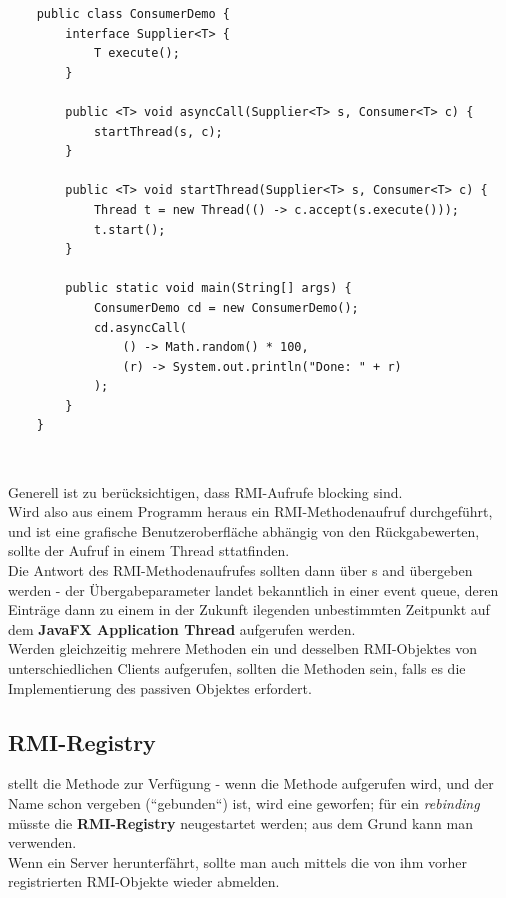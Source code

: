 \begin{verbatim}
    public class ConsumerDemo {
        interface Supplier<T> {
            T execute();
        }

        public <T> void asyncCall(Supplier<T> s, Consumer<T> c) {
            startThread(s, c);
        }

        public <T> void startThread(Supplier<T> s, Consumer<T> c) {
            Thread t = new Thread(() -> c.accept(s.execute()));
            t.start();
        }

        public static void main(String[] args) {
            ConsumerDemo cd = new ConsumerDemo();
            cd.asyncCall(
                () -> Math.random() * 100,
                (r) -> System.out.println("Done: " + r)
            );
        }
    }
\end{verbatim}\\

\begin{tcolorbox}
    Generell ist zu berücksichtigen, dass RMI-Aufrufe blocking sind.\\
    Wird also aus einem Programm heraus ein RMI-Methodenaufruf durchgeführt, und ist eine grafische Benutzeroberfläche abhängig von den Rückgabewerten, sollte der Aufruf in einem Thread sttatfinden.\\
    Die Antwort des RMI-Methodenaufrufes sollten dann über s and  übergeben werden - der Übergabeparameter landet bekanntlich in einer event queue, deren Einträge dann zu einem in der Zukunft ilegenden unbestimmten Zeitpunkt auf dem \textbf{JavaFX Application Thread} aufgerufen werden.\\
    Werden gleichzeitig mehrere Methoden ein und desselben RMI-Objektes von unterschiedlichen Clients aufgerufen, sollten die Methoden  sein, falls es die Implementierung des passiven Objektes erfordert.
\end{tcolorbox}

\subsection{RMI-Registry}

 stellt die Methode  zur Verfügung - wenn die Methode aufgerufen wird, und der Name schon vergeben (``gebunden``) ist, wird eine  geworfen; für ein \textit{rebinding} müsste die \textbf{RMI-Registry} neugestartet werden; aus dem Grund kann man  verwenden.\\
Wenn ein Server herunterfährt, sollte man auch mittels  die von ihm vorher registrierten RMI-Objekte wieder abmelden.

